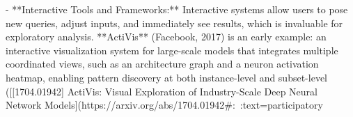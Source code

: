 - **Interactive Tools and Frameworks:** Interactive systems allow users to pose new queries, adjust inputs, and immediately see results, which is invaluable for exploratory analysis. **ActiVis** (Facebook, 2017) is an early example: an interactive visualization system for large-scale models that integrates multiple coordinated views, such as an architecture graph and a neuron activation heatmap, enabling pattern discovery at both instance-level and subset-level ([[1704.01942] ActiVis: Visual Exploration of Industry-Scale Deep Neural Network Models](https://arxiv.org/abs/1704.01942#:~:text=participatory%
